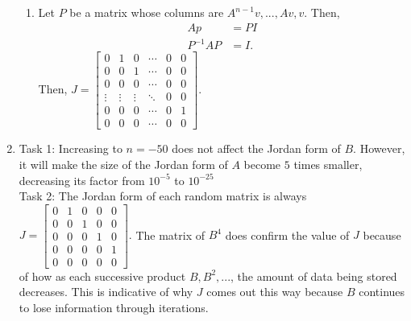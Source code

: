 \documentclass{article}
\begin{document}
\begin{enumerate}
\begin{enumerate}
        \item
        
        Let $P$ be a matrix whose columns are $A^{n-1}v,...,Av,v$. Then,
        \begin{align*}
            Ap&=PI\\
            P^{-1}AP&=I.
        \end{align*} Then, $J=\begin{bmatrix}
        0 & 1 & 0 & \cdots & 0 & 0\\
        0 & 0 & 1 & \cdots & 0 & 0\\
        0 & 0 & 0 & \cdots & 0 & 0\\
        \vdots & \vdots & \vdots & \ddots & 0 & 0\\
        0 & 0 & 0 & \cdots & 0 & 1\\
        0 & 0 & 0 & \cdots & 0 & 0
        \end{bmatrix}.$
        
    \end{enumerate}
    
    \item
    
    Task 1: Increasing to $n=-50$ does not affect the Jordan form of $B$. However, it will make the size of the Jordan form of $A$ become $5$ times smaller, decreasing its factor from $10^{-5}$ to $10^{-25}$\\
    Task 2: The Jordan form of each random matrix is always $J=\begin{bmatrix}
    0 & 1 & 0 & 0 & 0\\
    0 & 0 & 1 & 0 & 0\\
    0 & 0 & 0 & 1 & 0\\
    0 & 0 & 0 & 0 & 1\\
    0 & 0 & 0 & 0 & 0
    \end{bmatrix}.$ The matrix of $B^4$ does confirm the value of $J$ because of how as each successive product $B, B^2,...$, the amount of data being stored decreases. This is indicative of why $J$ comes out this way because $B$ continues to lose information through iterations.
    
\end{enumerate}
\end{document}
